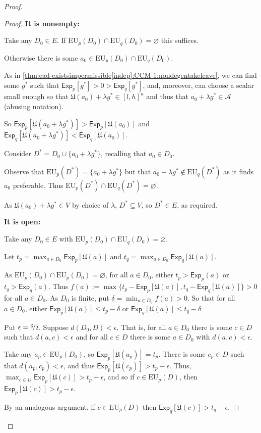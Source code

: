 \documentclass[a4paper]{article}
\newcommand\A{\mathcal{A}}
\newcommand\Exp{\mathsf{Exp}}
\newcommand\EU{\mathrm{EU}}
\newcommand\U{\mathfrak{U}} %
\renewcommand{\color}[1]{}
\newenvironment{colored}[1]{\leavevmode\color{#1}}{}
\renewcommand{\emptyset}{\varnothing}
\renewcommand{\leq}{\leqslant}
\newenvironment{CCM rewritten}
{\begingroup\color{blue}} %
{\endgroup}              %
\begin{document}
\begin{colored}{violet}
\begin{proof}
\begin{proof}
		
		\textbf{It is nonempty:}
		
		Take any $D_0\in E$. If $\EU_{p}(D_0)\cap \EU_{q}(D_0)=\emptyset$ this suffices. 
		
		Otherwise there is some $a_0\in \EU_{p}(D_0)\cap \EU_{q}(D_0)$. 
		
		As in \cref{thm:ead-existsimpermissible[indep]:CCM-1:nondegentakeleave}, we can find some $g^*$ such that $\Exp_{p}[g^*]>0>\Exp_{q}[g^*]$, and, moreover, can choose a scalar small enough so that $\U(a_0)+\lambda g^*\in[l,h]^n$ and thus that $a_0+\lambda g^*\in\A$ (abusing notation). 
		
		So $\Exp_{p}[\U(a_0+\lambda g^*)]>\Exp_{p}[\U(a_0)]$ and $\Exp_{q}[\U(a_0+\lambda g^*)]<\Exp_{q}[\U(a_0)]$.
		
		Consider $D^*=D_0\cup\{a_0+\lambda g^*\}$, recalling that $a_0\in D_0$. 
		
		Observe that $\EU_{p}(D^*)=\{a_0+\lambda g^*\}$ but that $a_0+\lambda g^*\notin\EU_{q}(D^*)$ as it finds $a_0$ preferable. 
		Thus $\EU_{p}(D^*)\cap \EU_{q}(D^*)=\emptyset$.
		
		As $\U(a_0)+\lambda g^*\in V$ by choice of $\lambda$, $D^*\subseteq V$, so $D^*\in E$, as required. 
		
		\textbf{It is open:}
		
		Take any $D_0\in E$ with $\EU_{p}(D_0)\cap \EU_{q}(D_0)=\emptyset$. 
		
		Let $t_p=\max_{a\in D_0}\Exp_{p}[\U(a)]$ and $t_q=\max_{a\in D_0}\Exp_{q}[\U(a)]$.
		
		As  $\EU_{p}(D_0)\cap \EU_{p}(D_0)=\emptyset$, for all $a\in D_0$, either $t_p>\Exp_{p}(a)$ or  $t_q>\Exp_{q}(a)$. Thus $f(a):=\max\{t_p-\Exp_{p}[\U(a)],t_q-\Exp_{q}[\U(a)]\}>0$ for all $a\in D_0$. As $D_0$ is finite, put $\delta=\min_{a\in D_0}f(a)>0$. So that for all $a\in D_0$, either  $\Exp_{p}[\U(a)]\leq t_p-\delta$ or $\Exp_{q}[\U(a)]\leq t_q-\delta$
		
		Put $\epsilon=\nicefrac{\delta}{2}$. Suppose $d(D_0,D)<\epsilon$. That is, for all $a\in D_0$ there is some $c\in D$ such that $d(a,c)<\epsilon$ and for all $c\in D$ there is some $a\in D_0$ with $d(a,c)<\epsilon$. 
		
		Take any $a_p\in \EU_{p}(D_0)$, so $\Exp_{p}[\U(a_p)]=t_p$. There is some $c_p\in D$ such that $d(a_p,c_p)<\epsilon$, and thus $\Exp_{p}[\U(c_p)]>t_p-\epsilon$. Thus, $\max_{c\in D}\Exp_{p}[\U(c)]>t_p-\epsilon$, and so if $c\in \EU_{p}(D)$, then $\Exp_{p}[\U(c)]>t_p-\epsilon$. 
		
		
		By an analogous argument, if $c\in \EU_{p}(D)$ then $\Exp_{q}[\U(c)]>t_q-\epsilon$. 
		

\end{proof}
\end{proof}
\end{colored}
\end{document}
